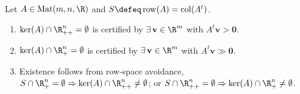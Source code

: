 \begin{method} \label{meth:positive-solution-certificates} \\
Let $A\in\operatorname{Mat}(m,n,\R)$ and $S\defeq\operatorname{row}(A)=\operatorname{col}(A^t)$.
\begin{enumerate}[label=(\roman*)]
\setlength{\itemsep}{0pt}
\item $\ker(A)\cap\R_{++}^n=\emptyset$ is certified by $\exists\,\mathbf{v}\in\R^m$ with $A^t\mathbf{v}>\mathbf{0}$.
\item $\ker(A)\cap\R_+^n=\emptyset$ is certified by $\exists\,\mathbf{v}\in\R^m$ with $A^t\mathbf{v}\gg\mathbf{0}$.
\item Existence follows from row-space avoidance,\\
$S\cap\R_+^n=\emptyset\Rightarrow\ker(A)\cap\R_{++}^n\neq\emptyset$; or $S\cap\R_{++}^n=\emptyset\Rightarrow\ker(A)\cap\R_+^n\neq\emptyset$.
\end{enumerate}
\end{method}

